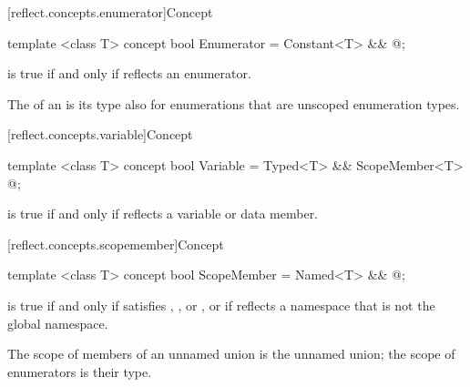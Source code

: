 [reflect.concepts.enumerator]{Concept }

\begin{std.txt}\color{addclr}

\begin{itemdecl}
template <class T> concept bool Enumerator = Constant<T> && @\seebelow@;
\end{itemdecl}

\begin{itemdescr}
\pnum
{} is true if and only if  reflects an enumerator. \begin{note} The  of an  is its type also for enumerations that are unscoped enumeration types. \end{note}

\end{itemdescr}
\end{std.txt}

[reflect.concepts.variable]{Concept }

\begin{std.txt}\color{addclr}

\begin{itemdecl}
template <class T> concept bool Variable = Typed<T> && ScopeMember<T> @\seebelow@;
\end{itemdecl}

\begin{itemdescr}
\pnum
{} is true if and only if  reflects a variable or data member.

\end{itemdescr}
\end{std.txt}

[reflect.concepts.scopemember]{Concept }

\begin{std.txt}\color{addclr}

\begin{itemdecl}
template <class T> concept bool ScopeMember = Named<T> && @\seebelow@;
\end{itemdecl}

\begin{itemdescr}
\pnum
{} is true if and only if  satisfies , , or , or if  reflects a namespace that is not the global namespace. \begin{note} The scope of members of an unnamed union is the unnamed union; the scope of enumerators is their type. \end{note}

\end{itemdescr}
\end{std.txt}

